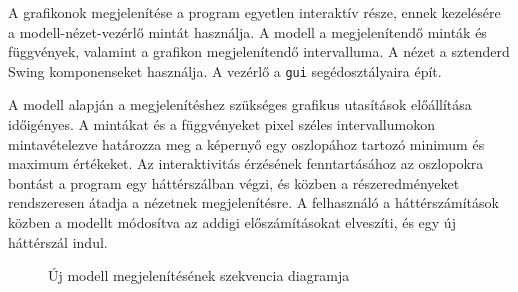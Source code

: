 A grafikonok megjelenítése a program egyetlen interaktív része, ennek kezelésére a modell-nézet-vezérlő mintát használja.
A modell a megjelenítendő minták és függvények, valamint a grafikon megjelenítendő intervalluma.
A nézet a sztenderd Swing komponenseket használja.
A vezérlő a \texttt{gui} segédosztályaira épít.

A modell alapján a megjelenítéshez szükséges grafikus utasítások előállítása időigényes. A mintákat és a függvényeket pixel széles intervallumokon mintavételezve határozza meg a képernyő egy oszlopához tartozó minimum és maximum értékeket.
Az interaktivitás érzésének fenntartásához az oszlopokra bontást a program egy háttérszálban végzi, és közben a részeredményeket rendszeresen átadja a nézetnek megjelenítésre.
A felhasználó a háttérszámítások közben a modellt módosítva az addigi előszámításokat elveszíti, és egy új háttérszál indul.

\begin{figure}[H]
\centering
\caption{Új modell megjelenítésének szekvencia diagramja}
\end{figure}

